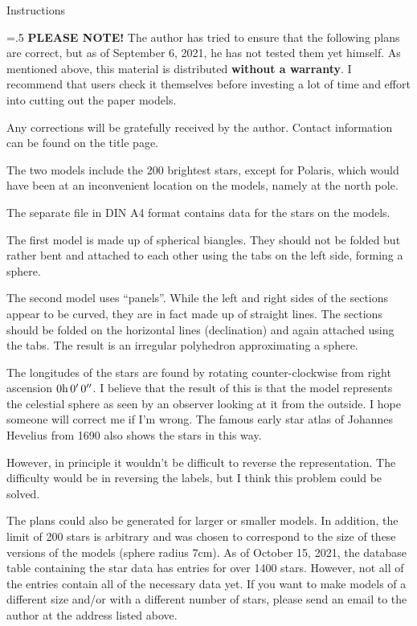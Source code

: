 \medium
{}
\centerline{{\largebx Instructions}}
\parskip=.5\baselineskip
{\bf PLEASE NOTE!}  The author has tried to ensure that the following
plans are correct, but as of September 6, 2021, he has not tested them
yet himself.  As mentioned above, this material is distributed
{\bf without a warranty}.  I recommend that users check it themselves before
investing a lot of time and effort into cutting out the paper models.

Any corrections will be gratefully received by the author.  Contact
information can be found on the title page.

The two models include the 200 brightest stars, except for Polaris,
which would have been at an inconvenient location on the models,
namely at the north pole.

The separate file
\href{https://www.gnu.org/software/3dldf/graphics/clstsph1_a4.pdf}{}
in DIN A4 format contains data for the stars on the models.

The first model is made up of spherical biangles. They should not be
folded but rather bent and attached to each other using the tabs on
the left side, forming a sphere.

The second model uses ``panels''. While the left and right sides of the sections
appear to be curved, they are in fact made up of straight lines. The sections should
be folded on the horizontal lines (declination) and again attached using the tabs.
The result is an irregular polyhedron approximating a sphere.

The longitudes of the stars are found by rotating counter-clockwise
from right ascension $0\rm{h}\thinspace 0^\prime\thinspace 0^{\prime\prime}$.
I believe that the result of this is that the model represents the celestial sphere
as seen by an observer looking at it from the outside. I hope someone will correct me
if I'm wrong. The famous early star atlas of Johannes Hevelius from 1690 also shows the stars
in this way.

However, in principle it wouldn't be difficult to reverse the representation. The difficulty would be
in reversing the labels, but I think this problem could be solved.

The plans could also be generated for larger or smaller models.
In addition, the limit of 200 stars is arbitrary and was chosen to correspond to the size of
these versions of the models (sphere radius 7cm).  
As of October 15, 2021, the database table containing the star data has
entries for over 1400 stars.  However, not all of the entries contain all of the necessary data yet.
If you want to make models of a different size and/or with a different number of stars, please send
an email to the author at the address listed above.
\baselineskip
\endgroup

